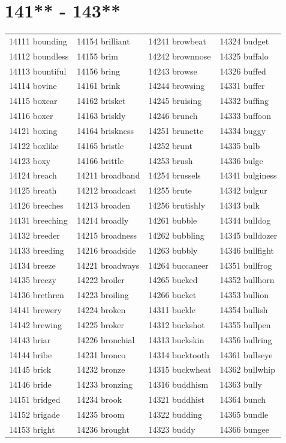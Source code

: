 \documentclass[10pt, oneside]{book}
\begin{document}
\begin{table}
	\centering
	\section*{141** - 143**}
	\begin{tabular}{l l l l}
14111 bounding &14154 brilliant &14241 browbeat &14324 budget\\
14112 boundless &14155 brim &14242 brownnose &14325 buffalo\\
14113 bountiful &14156 bring &14243 browse &14326 buffed\\
14114 bovine &14161 brink &14244 browsing &14331 buffer\\
14115 boxcar &14162 brisket &14245 bruising &14332 buffing\\
14116 boxer &14163 briskly &14246 brunch &14333 buffoon\\
14121 boxing &14164 briskness &14251 brunette &14334 buggy\\
14122 boxlike &14165 bristle &14252 brunt &14335 bulb\\
14123 boxy &14166 brittle &14253 brush &14336 bulge\\
14124 breach &14211 broadband &14254 brussels &14341 bulginess\\
14125 breath &14212 broadcast &14255 brute &14342 bulgur\\
14126 breeches &14213 broaden &14256 brutishly &14343 bulk\\
14131 breeching &14214 broadly &14261 bubble &14344 bulldog\\
14132 breeder &14215 broadness &14262 bubbling &14345 bulldozer\\
14133 breeding &14216 broadside &14263 bubbly &14346 bullfight\\
14134 breeze &14221 broadways &14264 buccaneer &14351 bullfrog\\
14135 breezy &14222 broiler &14265 bucked &14352 bullhorn\\
14136 brethren &14223 broiling &14266 bucket &14353 bullion\\
14141 brewery &14224 broken &14311 buckle &14354 bullish\\
14142 brewing &14225 broker &14312 buckshot &14355 bullpen\\
14143 briar &14226 bronchial &14313 buckskin &14356 bullring\\
14144 bribe &14231 bronco &14314 bucktooth &14361 bullseye\\
14145 brick &14232 bronze &14315 buckwheat &14362 bullwhip\\
14146 bride &14233 bronzing &14316 buddhism &14363 bully\\
14151 bridged &14234 brook &14321 buddhist &14364 bunch\\
14152 brigade &14235 broom &14322 budding &14365 bundle\\
14153 bright &14236 brought &14323 buddy &14366 bungee\\
	\end{tabular}
 \end{table}
\clearpage
\end{document}
